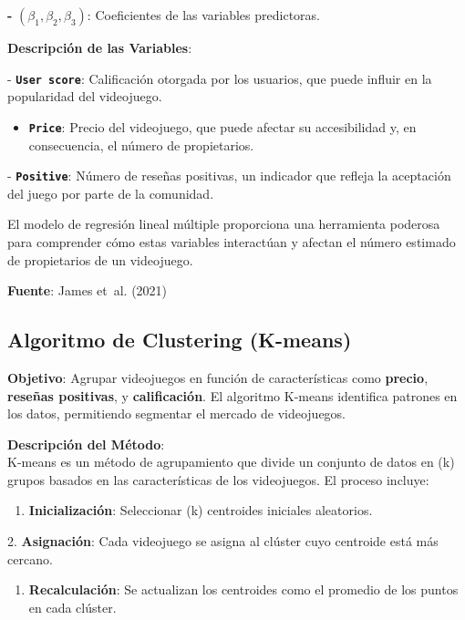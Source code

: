 \documentclass[
  letterpaper,
  DIV=11,
  numbers=noendperiod]{scrreprt}
\providecommand{\tightlist}{%
  \setlength{\itemsep}{0pt}\setlength{\parskip}{0pt}}\usepackage{longtable,booktabs,array}
\begin{document}
\textbf{-} \((\beta_1, \beta_2, \beta_3)\): Coeficientes de las
variables predictoras.

\textbf{Descripción de las Variables}:

- \textbf{\texttt{User\ score}}: Calificación otorgada por los usuarios,
que puede influir en la popularidad del videojuego.

\begin{itemize}
\tightlist
\item
  \textbf{\texttt{Price}}: Precio del videojuego, que puede afectar su
  accesibilidad y, en consecuencia, el número de propietarios.
\end{itemize}

- \textbf{\texttt{Positive}}: Número de reseñas positivas, un indicador
que refleja la aceptación del juego por parte de la comunidad.

El modelo de regresión lineal múltiple proporciona una herramienta
poderosa para comprender cómo estas variables interactúan y afectan el
número estimado de propietarios de un videojuego.

\textbf{Fuente}: James et~al. (2021)

\subsection{Algoritmo de Clustering
(K-means)}\label{algoritmo-de-clustering-k-means}

\textbf{Objetivo}: Agrupar videojuegos en función de características
como \textbf{precio}, \textbf{reseñas positivas}, y
\textbf{calificación}. El algoritmo K-means identifica patrones en los
datos, permitiendo segmentar el mercado de videojuegos.

\textbf{Descripción del Método}:\\
K-means es un método de agrupamiento que divide un conjunto de datos en
(k) grupos basados en las características de los videojuegos. El proceso
incluye:

\begin{enumerate}
\def\labelenumi{\arabic{enumi}.}
\tightlist
\item
  \textbf{Inicialización}: Seleccionar (k) centroides iniciales
  aleatorios.
\end{enumerate}

2. \textbf{Asignación}: Cada videojuego se asigna al clúster cuyo
centroide está más cercano.

\begin{enumerate}
\def\labelenumi{\arabic{enumi}.}
\setcounter{enumi}{2}
\tightlist
\item
  \textbf{Recalculación}: Se actualizan los centroides como el promedio
  de los puntos en cada clúster.
\end{enumerate}
\end{document}
